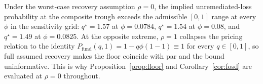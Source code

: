 Under the worst-case recovery assumption $\rho=0$, the implied unremediated-loss probability at
the composite trough exceeds the admissible $[0,1]$ range at every $\phi$ in the sensitivity
grid: $q^{\star}=1.57$ at $\phi=0.0784$, $q^{\star}=1.54$ at $\phi=0.08$, and $q^{\star}=1.49$ at
$\phi=0.0825$. At the opposite extreme, $\rho=1$ collapses the pricing relation to the identity
$P_{\mathrm{fund}}(q,1)=1-q\phi(1-1)\equiv 1$ for every $q\in[0,1]$, so full assumed recovery
makes the floor coincide with par and the bound uninformative. This is why
Proposition~\ref{prop:floor} and
Corollary~\ref{cor:fosd} are evaluated at $\rho=0$ throughout.
